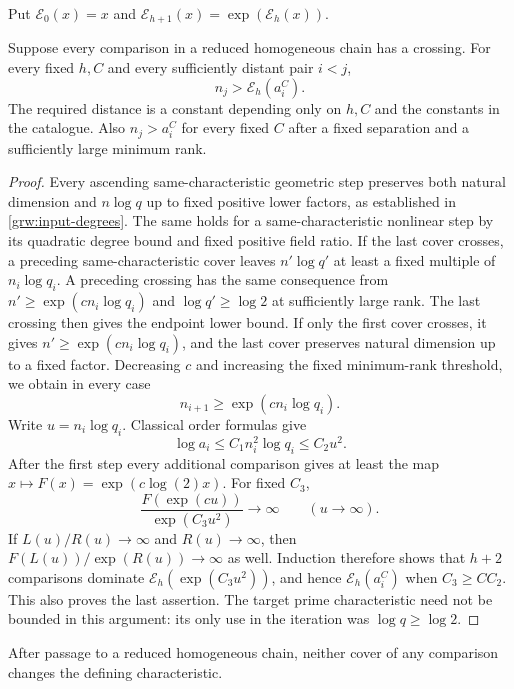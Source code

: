 Put $\mathcal E_0(x)=x$ and
$\mathcal E_{h+1}(x)=\exp(\mathcal E_h(x))$.

\begin{lemma}\label{grw:towers}
Suppose every comparison in a reduced homogeneous chain has a crossing.
For every fixed $h,C$ and every sufficiently distant pair $i<j$,
\[
 n_j>\mathcal E_h(a_i^C).
\]
The required distance is a constant depending only on $h,C$ and the
constants in the catalogue.  Also $n_j>a_i^C$ for every fixed $C$ after
a fixed separation and a sufficiently large minimum rank.
\end{lemma}

\begin{proof}
Every ascending same-characteristic geometric step preserves both
natural dimension and $n\log q$ up to fixed positive lower factors,
as established in \ref{grw:input-degrees}.  The same holds for a
same-characteristic nonlinear step by its quadratic degree bound and
fixed positive field ratio.  If the last cover crosses, a preceding
same-characteristic cover leaves $n'\log q'$ at least a fixed multiple
of $n_i\log q_i$.  A preceding crossing has the same consequence
from $n'\ge\exp(c n_i\log q_i)$ and $\log q'\ge\log2$ at sufficiently
large rank.  The last crossing then gives the endpoint lower bound.
If only the first cover crosses, it gives
$n'\ge\exp(c n_i\log q_i)$, and the last cover preserves natural
dimension up to a fixed factor.  Decreasing $c$ and increasing the
fixed minimum-rank threshold, we obtain in every case
\[
 n_{i+1}\ge\exp(c n_i\log q_i).
\]
Write
$u=n_i\log q_i$.  Classical order formulas give
\[
 \log a_i\le C_1 n_i^2\log q_i\le C_2u^2.
\]
After the first step every additional comparison gives at least the
map $x\mapsto F(x)=\exp(c\log(2)x)$.  For fixed $C_3$,
\[
 \frac{F(\exp(cu))}{\exp(C_3u^2)}\longrightarrow\infty
       \qquad(u\longrightarrow\infty).
\]
If $L(u)/R(u)\longrightarrow\infty$ and $R(u)\longrightarrow\infty$,
then $F(L(u))/\exp(R(u))\longrightarrow\infty$ as well.  Induction
therefore shows that $h+2$ comparisons dominate
$\mathcal E_h(\exp(C_3u^2))$, and hence
$\mathcal E_h(a_i^C)$ when $C_3\ge CC_2$.  This also proves the last
assertion.  The target prime characteristic need not be bounded in
this argument: its only use in the iteration was $\log q\ge\log2$.
\end{proof}

\begin{proposition}\label{grw:no-crossing}
After passage to a reduced homogeneous chain, neither cover of any
comparison changes the defining characteristic.
\end{proposition}

